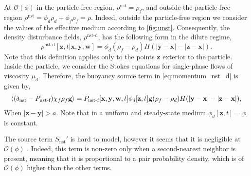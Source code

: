 At $\mathcal{O}(\phi)$ in the particle-free-region, $\rho^\text{nst} = \rho_f$, and outside the particle-free region $\rho^\text{nst} = \phi_d\rho_d + \phi_f\rho_f= \rho$.
Indeed, outside the particle-free region we consider the values of the effective medium according to \ref{fig:unst}. 
Consequently, the density disturbance fields, $\rho^\text{nst-d}$, has the following form in the dilute regime, 
\begin{equation*}
    \rho^\text{nst-d}[\textbf{z},t|\textbf{x},\textbf{y},\textbf{w}]
    = \phi_d (\rho_f - \rho_d) H(|\textbf{y} - \textbf{x}| - |\textbf{z} - \textbf{x}|).
\end{equation*}
Note that this definition applies only to the points \textbf{z} exterior to the particle. 
Inside the particle, we consider the Stokes equations for single-phase flows of viscosity $\mu_d$. 
Therefore, the buoyancy source term in \ref{eq:momentum_nst_d} is given by, 
\begin{equation*}
    \left<(\delta_\text{nst} - P_\text{nst-f}) \chi_f \rho_f \textbf{g}\right>
    = 
    P_\text{nst-f} [\textbf{x},\textbf{y},\textbf{w},t]
    \phi_d[\textbf{z},t] 
    \textbf{g}
    (\rho_f - \rho_d) H(|\textbf{y} - \textbf{x}| - |\textbf{z} - \textbf{x}|), 
\end{equation*}
When $|\textbf{z} - \textbf{y}| > a$. 
Note that in a uniform and steady-state medium $\phi_d[\textbf{z},t] = \phi$ is constant. 


The source term $S_\text{nst}'$ is hard to model, however it seems that it is negligible at $\mathcal{O}(\phi)$ \citet{zhang2021ensemble}. 
Indeed, this term is non-zero only when a second-nearest neighbor is present, meaning that it is proportional to a pair probability density, which is of $\mathcal{O}(\phi)$ higher than the other terms. 

